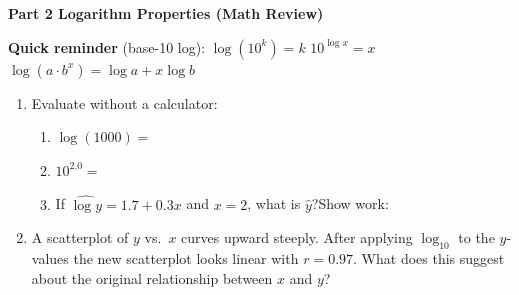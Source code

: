 \documentclass[10pt]{article}
\begin{document}
\vspace{0.28in}

{\large\bfseries\color{navy} Part 2 \quad Logarithm Properties (Math Review)}

\vspace{0.12in}

\begin{tcolorbox}[colback=greenbg, colframe=greenacc, boxrule=0.8pt, arc=2mm,
    left=4mm, right=4mm, top=3mm, bottom=3mm]
    \small
    \textbf{Quick reminder} (base-10 log):\quad
    $\log(10^k) = k$ \quad $10^{\log x} = x$ \quad
    $\log(a \cdot b^x) = \log a + x\log b$
\end{tcolorbox}

\vspace{0.14in}

\begin{enumerate}[leftmargin=1.6em, itemsep=0.18in, resume]

  \item Evaluate without a calculator:

        \begin{enumerate}[label=\textbf{(\alph*)}, leftmargin=1.6em, itemsep=6pt]
          \item $\log(1000) = $ 
          \item $10^{2.0} = $ 
          \item If $\widehat{\log y} = 1.7 + 0.3x$ and $x = 2$,
                what is $\hat{y}$?\quad Show work: 
        \end{enumerate}

  \item A scatterplot of $y$ vs.\ $x$ curves upward steeply. After applying $\log_{10}$ to
        the $y$-values the new scatterplot looks linear with $r = 0.97$.
        What does this suggest about the original relationship between $x$ and $y$?\\[8pt]

\end{enumerate}
\end{document}

